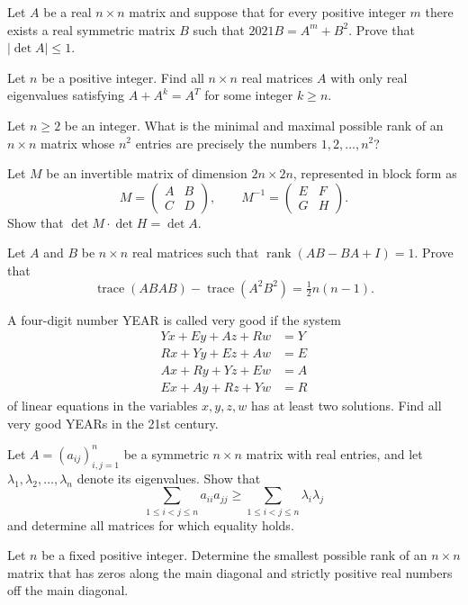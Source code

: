 \documentclass[12pt]{article}
\begin{document}
\begin{problems}
\item Let $A$ be a real $n\times n$ matrix and suppose that for every positive integer $m$ there exists a real symmetric matrix $B$ such that $2021B = A^m+B^2$. Prove that $|\det A| \le 1$.

\item Let $n$ be a positive integer. Find all $n\times n$ real matrices $A$ with only real eigenvalues satisfying $A+A^k = A^T$ for some integer $k\ge n$.

\item Let $n\ge 2$ be an integer. What is the minimal and maximal possible rank of an $n\times n$ matrix whose $n^2$ entries are precisely the numbers $1,2,\dots,n^2$?

\item Let $M$ be an invertible matrix of dimension $2n\times 2n$, represented in block form as
\[
M = \begin{pmatrix} A & B\\ C & D\end{pmatrix}, \qquad M^{-1} = \begin{pmatrix} E & F\\ G & H\end{pmatrix}.
\]
Show that $\det M \cdot \det H = \det A$.

\item Let $A$ and $B$ be $n\times n$ real matrices such that $\operatorname{rank}(AB-BA+I)=1$. Prove that
\[
\operatorname{trace}(ABAB) - \operatorname{trace}(A^2B^2) = \tfrac12 n(n-1).
\]

\item A four-digit number YEAR is called very good if the system
\[
\begin{aligned}
Yx+Ey+Az+Rw &= Y\\
Rx+Yy+Ez+Aw &= E\\
Ax+Ry+Yz+Ew &= A\\
Ex+Ay+Rz+Yw &= R
\end{aligned}
\]
of linear equations in the variables $x,y,z,w$ has at least two solutions. Find all very good YEARs in the 21st century.

\item Let $A=(a_{ij})_{i,j=1}^n$ be a symmetric $n\times n$ matrix with real entries, and let $\lambda_1,\lambda_2,\dots,\lambda_n$ denote its eigenvalues. Show that
\[
\sum_{1\le i<j\le n} a_{ii}a_{jj} \ge \sum_{1\le i<j\le n}\lambda_i\lambda_j
\]
and determine all matrices for which equality holds.

\item Let $n$ be a fixed positive integer. Determine the smallest possible rank of an $n\times n$ matrix that has zeros along the main diagonal and strictly positive real numbers off the main diagonal.


\end{problems}
\end{document}
